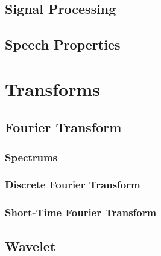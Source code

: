 \documentclass{book}
\begin{document}
  \section{Signal Processing}
  \section{Speech Properties}

\chapter{Transforms}
  \section{Fourier Transform}
    \subsection{Spectrums}
    \subsection{Discrete Fourier Transform}
    \subsection{Short-Time Fourier Transform}
  \section{Wavelet}
\end{document}
